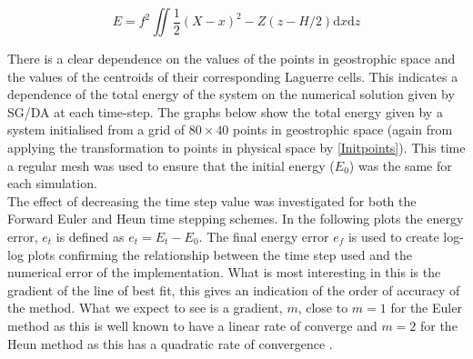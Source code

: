 \begin{equation}
	E = f^2 \iint \frac{1}{2}\left(X-x\right)^2 - Z\left(z - H/2\right)\textrm{d}x\textrm{d}z
\end{equation}

There is a clear dependence on the values of the points in geostrophic space and the values of the centroids of their corresponding Laguerre cells. This indicates a dependence of the total energy of the system on the numerical solution given by SG/DA at each time-step. The graphs below show the total energy given by a system initialised from a grid of $80 \times 40$ points in geostrophic space (again from applying the transformation to points in physical space by \ref{Initpoints}). This time a regular mesh was used to ensure that the initial energy ($E_0$) was the same for each simulation. \\
\linebreak
The effect of decreasing the time step value was investigated for  both the Forward Euler and Heun time stepping schemes. In the following plots the energy error, $e_t$ is defined as $e_t = E_{t} - E_0$. The final energy error $e_f$ is used to create log-log plots confirming the relationship between the time step used and the numerical error of the implementation. What is most interesting in this is the gradient of the line of best fit, this gives an indication of the order of accuracy of the method. What we expect to see is a gradient, $m$, close to $m=1$ for the Euler method as this is well known to have a linear rate of converge \cite{Griffiths2010} and $m=2$ for the Heun method as this has a quadratic rate of convergence \cite{Griffiths2010}.
\newpage


\newpage

